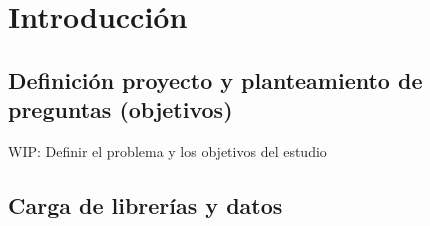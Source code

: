 \documentclass[,,,,pdftex]{Definitions/mdpi}
\begin{document}

\section{Introducción}\label{introducciuxf3n}

\subsection{Definición proyecto y planteamiento de preguntas
(objetivos)}\label{definiciuxf3n-proyecto-y-planteamiento-de-preguntas-objetivos}

WIP: Definir el problema y los objetivos del estudio

\subsection{Carga de librerías y
datos}\label{carga-de-libreruxedas-y-datos}
\end{document}
